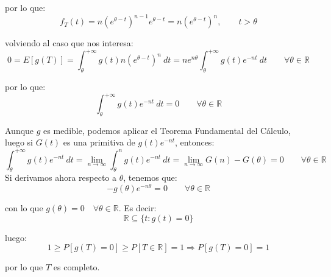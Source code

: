 \begin{ejercicio}
    por lo que:
    \begin{equation*}
        f_T(t) = n{\left(e^{\theta-t}\right)}^{n-1}e^{\theta-t} = n{\left(e^{\theta-t}\right)}^{n}, \qquad t>\theta
    \end{equation*}

    volviendo al caso que nos interesa:
    \begin{equation*}
        0 = E[g(T)] = \int_{\theta}^{+\infty} g(t)n{\left(e^{\theta-t}\right)}^{n} ~dt  = ne^{n\theta} \int_{\theta}^{+\infty} g(t)e^{-nt} ~dt  \qquad \forall \theta \in \mathbb{R}
    \end{equation*}

    por lo que:
    \begin{equation*}
        \int_{\theta}^{+\infty} g(t)e^{-nt}~dt  = 0 \qquad \forall \theta\in \mathbb{R}
    \end{equation*}

    Aunque $g$ es medible, podemos aplicar el Teorema Fundamental del Cálculo, luego si $G(t)$ es una primitiva de $g(t)e^{-nt}$, entonces:
    \begin{equation*}
        \int_{\theta}^{+\infty} g(t)e^{-nt}~dt = \lim_{n\to\infty}\int_{\theta}^{n}g(t)e^{-nt} ~dt  = \lim_{n\to\infty}G(n)-G(\theta) =  0 \qquad \forall \theta\in \mathbb{R}
    \end{equation*}
    Si derivamos ahora respecto a $\theta$, tenemos que:
    \begin{equation*}
        -g(\theta)e^{-n\theta} = 0\qquad \forall \theta\in \mathbb{R}
    \end{equation*}

    con lo que $g(\theta) = 0 \quad \forall \theta\in \mathbb{R}$. Es decir:
    \begin{equation*}
        \mathbb{R}\subseteq \{t:g(t) = 0\}
    \end{equation*}

    luego:
    \begin{equation*}
        1\geq P[g(T)=0] \geq P[T\in \mathbb{R}] = 1 \Longrightarrow P[g(T)=0]=1
    \end{equation*}

    por lo que $T$ es completo.
\end{ejercicio}

